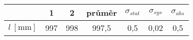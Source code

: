 \begin{tabular}{ccccccc}																											\toprule
							&	1		&	2		&	průměr	& 	$\sigma_{stat}$	&	$\sigma_{sys}$		&	$\sigma_{abs}$	\\	\midrule
$l \ [\si{\milli\metre}]$	&	997 	&	998		&	997,5	&	0,5  			&	0,02				&	0,5				\\ 	\bottomrule
\end{tabular}
